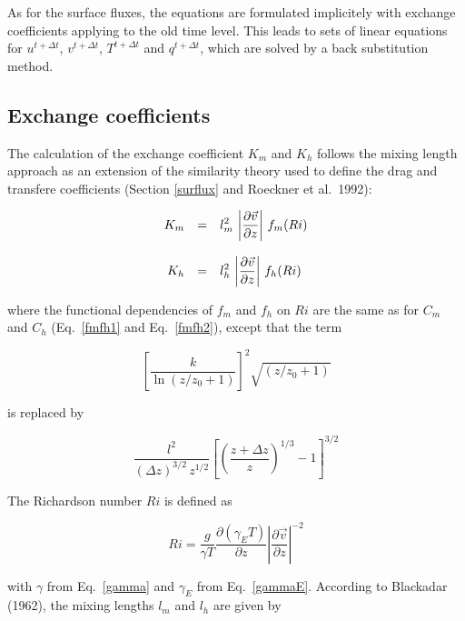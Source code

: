 As for the surface fluxes, the equations are formulated
implicitely with exchange coefficients applying to the
old time level. This  leads to sets of linear equations for
$u^{t+\Delta t}$, $v^{t+\Delta t}$, $T^{t+\Delta t}$
and $q^{t+\Delta t}$, which are solved by a back
substitution method.
 
\subsection*{Exchange coefficients}

The calculation of the exchange coefficient $K_m$ and
$K_h$ follows the mixing length
approach as an extension of the similarity theory used
to
define the drag and transfere
coefficients (Section \ref{surflux} and Roeckner et
al.~1992):

\begin{equation}
\begin{array}{rcl}
\displaystyle K_m & = & \displaystyle  l_m^2\, \left|
\frac{\partial\vec{v}}{\partial
z}
\right| \, f_m(Ri) \\
&&\\
\displaystyle K_h & = & \displaystyle  l_h^2\, \left|
\frac{\partial\vec{v}}{\partial
z}
\right| \, f_h(Ri)
\end{array}
\end{equation}

where the functional dependencies of $f_m$ and $f_h$
on
$Ri$ are the same as for $C_m$ and $C_h$
(Eq.~\ref{fmfh1} and Eq.~\ref{fmfh2}), except that
the
term 

\begin{equation}
 \left[\frac{k}{\ln(z/z_0+1)}\right]^2\sqrt{(z/z_0+1)}
\end{equation}

is replaced by

\begin{equation}
\frac{l^2}{(\Delta z)^{3/2} \, z^{1/2}}\left[ \left(
\frac{z+\Delta z}{z}\right)^{1/3} -1 \right]^{3/2}
\end{equation}

The Richardson number $Ri$  is defined as

\begin{equation}
Ri=\frac{g}{\gamma T} \frac{\partial (\gamma_E
T)}{\partial z} \left| \frac{\partial \vec{v}}{\partial z}
\right|^{-2}
\end{equation}

with $\gamma$ from Eq.~\ref{gamma} and $\gamma_E$ from Eq.~\ref{gammaE}.  According
to
Blackadar (1962), the mixing lengths $l_m$ and $l_h$
are
given by

